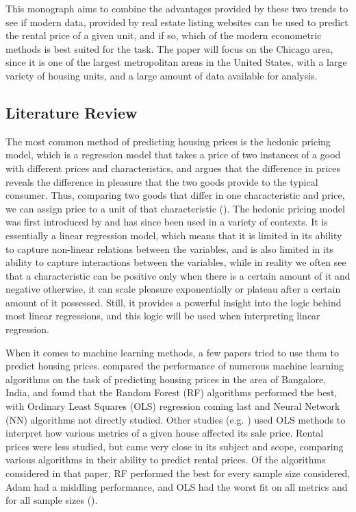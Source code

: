 \documentclass[12pt]{report}
\begin{document}
This monograph aims to combine the advantages provided by these two trends to see if modern data, provided by real estate listing websites can be used to predict the rental price of a given unit, and if so, which of the modern econometric methods is best suited for the task. The paper will focus on the Chicago area, since it is one of the largest metropolitan areas in the United States, with a large variety of housing units, and a large amount of data available for analysis.

\subsection{Literature Review}

The most common method of predicting housing prices is the hedonic pricing model, which is a regression model that takes a price of two instances of a good with different prices and characteristics, and argues that the difference in prices reveals the difference in pleasure that the two goods provide to the typical consumer. Thus, comparing two goods that differ in one characteristic and price, we can assign price to a unit of that characteristic (\cite{taylor2003}). The hedonic pricing model was first introduced by \textcite{rosen1974} and has since been used in a variety of contexts.  It is essentially a linear regression model, which means that it is limited in its ability to capture non-linear relations between the variables, and is also limited in its ability to capture interactions between the variables, while in reality we often see that a characteristic can be positive only when there is a certain amount of it and negative otherwise, it can scale pleasure exponentially or plateau after a certain amount of it possessed. Still, it provides a powerful insight into the logic behind most linear regressions, and this logic will be used when interpreting linear regression.

When it comes to machine learning methods, a few papers tried to use them to predict housing prices. \textcite{joshi2022} compared the performance of numerous machine learning algorithms on the task of predicting housing prices in the area of Bangalore, India, and found that the Random Forest (RF) algorithms performed the best, with Ordinary Least Squares (OLS) regression coming last and Neural Network (NN) algorithms not directly studied. Other studies (e.g. \textcite{zietz2008}) used OLS methods to interpret how various metrics of a given house affected its sale price. Rental prices were less studied, but \textcite{yoshida2022} came very close in its subject and scope, comparing various algorithms in their ability to predict rental prices. Of the algorithms considered in that paper, RF performed the best for every sample size considered, Adam had a middling performance, and OLS had the worst fit on all metrics and for all sample sizes (\cite[p. 19]{yoshida2022}).
\end{document}
